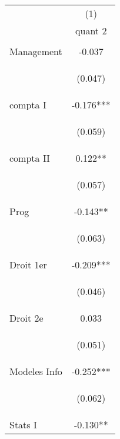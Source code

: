 \documentclass{article} %
\begin{document}
\begin{table}[H]

\begin{center}
\begin{tabular}{lc} \hline
 & (1) \\
 & quant 2 \\ \hline
\vspace{4pt} & \begin{footnotesize}\end{footnotesize} \\
Management & -0.037 \\
\vspace{4pt} & \begin{footnotesize}(0.047)\end{footnotesize} \\
compta I & -0.176*** \\
\vspace{4pt} & \begin{footnotesize}(0.059)\end{footnotesize} \\
compta II & 0.122** \\
\vspace{4pt} & \begin{footnotesize}(0.057)\end{footnotesize} \\
Prog & -0.143** \\
\vspace{4pt} & \begin{footnotesize}(0.063)\end{footnotesize} \\
Droit 1er & -0.209*** \\
\vspace{4pt} & \begin{footnotesize}(0.046)\end{footnotesize} \\
Droit 2e & 0.033 \\
\vspace{4pt} & \begin{footnotesize}(0.051)\end{footnotesize} \\
Modeles Info & -0.252*** \\
\vspace{4pt} & \begin{footnotesize}(0.062)\end{footnotesize} \\
Stats I & -0.130** \\

\end{tabular}
\end{center}
\end{table}
\end{document}
